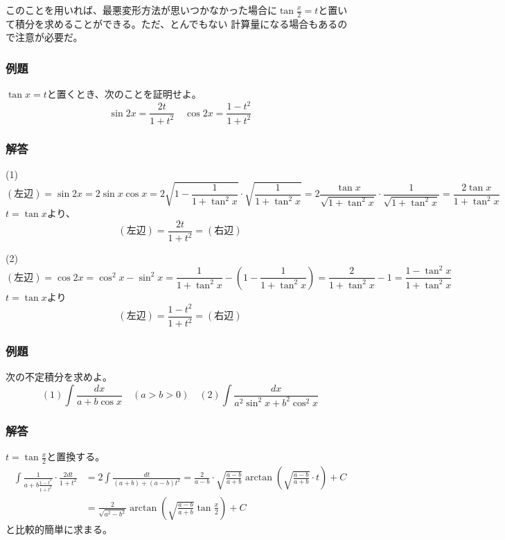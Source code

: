 \documentclass[a4j,dvipdfmx]{jsarticle}
\begin{document}
このことを用いれば、最悪変形方法が思いつかなかった場合に$\tan \frac{x}{2}=t$と置いて積分を求めることができる。ただ、とんでもない
計算量になる場合もあるので注意が必要だ。
\subsubsection*{例題}
$\tan x=t$と置くとき、次のことを証明せよ。
\begin{equation*}
    \sin 2x=\frac{2t}{1+t^2}\quad\cos 2x=\frac{1-t^2}{1+t^2}
\end{equation*}
\subsubsection*{解答}
(1)
\begin{equation*}
    (\text{左辺})=\sin 2x=2\sin x\cos x=2\sqrt{1-\frac{1}{1+\tan^2 x}}\cdot\sqrt{\frac{1}{1+\tan^2 x}}=2\frac{\tan x}{\sqrt{1+\tan^2 x}}\cdot\frac{1}{\sqrt{1+\tan^2 x}}=\frac{2\tan x}{1+\tan^2 x}
\end{equation*}
$t=\tan x$より、
\begin{equation*}
    (\text{左辺})=\frac{2t}{1+t^2}=(\text{右辺})
\end{equation*}

(2)
\begin{equation*}
    (\text{左辺})=\cos 2x=\cos^2 x-\sin^2 x=\frac{1}{1+\tan^2 x}-(1-\frac{1}{1+\tan^2 x})=\frac{2}{1+\tan^2 x}-1=\frac{1-\tan^2 x}{1+\tan^2 x}
\end{equation*}
$t=\tan x$より
\begin{equation*}
    (\text{左辺})=\frac{1-t^2}{1+t^2}=(\text{右辺})
\end{equation*}
\subsubsection*{例題}
次の不定積分を求めよ。
\begin{equation*}
    (1)\int \frac{dx}{a+b\cos x}\quad(a>b>0)\quad(2)\int\frac{dx}{a^2\sin^2x+b^2\cos^2 x}
\end{equation*}
\subsubsection*{解答}
$t=\tan\frac{x}{2}$と置換する。
\begin{align*}
    \int \frac{1}{a+b\frac{1-t^2}{1+t^2}}\cdot\frac{2dt}{1+t^2}&=2\int\frac{dt}{(a+b)+(a-b)t^2}=\frac{2}{a-b}\cdot\sqrt{\frac{a-b}{a+b}}\arctan\left(\sqrt{\frac{a-b}{a+b}}\cdot t\right)+C\\
    &=\frac{2}{\sqrt{a^2-b^2}}\arctan\left(\sqrt{\frac{a-b}{a+b}}\tan\frac{x}{2}\right)+C
\end{align*}
と比較的簡単に求まる。
\end{document}
